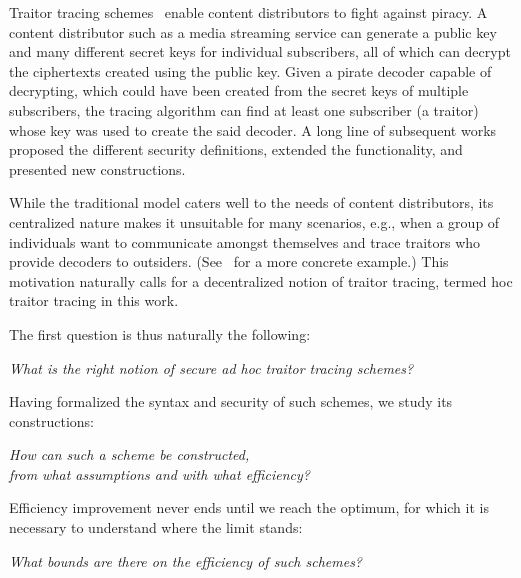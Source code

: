 Traitor tracing schemes~\cite{C:ChoFiaNao94} enable content distributors to fight against piracy.
A content distributor such as a media streaming service can generate a public key and many different secret keys for individual subscribers,
all of which can decrypt the ciphertexts created using the public key.
Given a pirate decoder capable of decrypting,
which could have been created from the secret keys of multiple subscribers,
the tracing algorithm can find at least one subscriber (a traitor) whose key was used to create the said decoder.
A long line of subsequent works~\cite{EC:BonSahWat06,CCS:BonWat06,CCS:BonNao08,C:BonZha14,EC:NisWicZha16,STOC:GoyKopWat18,C:GKRW18,TCC:CVWWW18,C:GQWW19,TCC:GoyKopWat19,C:Zhandry20,C:Zhandry21} proposed the different security definitions, extended the functionality, and presented new constructions.

While the traditional model caters well to the needs of content distributors,
its centralized nature makes it unsuitable for many scenarios,
e.g., when a group of individuals want to communicate amongst themselves and trace traitors who provide decoders to outsiders. (See~\cite{C:Zhandry21} for a more concrete example.)
This motivation naturally calls for a decentralized notion of traitor tracing, termed \ad hoc traitor tracing in this work.

The first question is thus naturally the following:
\begin{center}
\itshape
What is the right notion of secure ad hoc traitor tracing schemes?\\
\end{center}
Having formalized the syntax and security of such schemes,
we study its constructions:
\begin{center}
\itshape
How can such a scheme be constructed,\\
from what assumptions and with what efficiency?
\end{center}
Efficiency improvement never ends until we reach the optimum,
for which it is necessary to understand where the limit stands:
\begin{center}
\itshape
What bounds are there on the efficiency of such schemes?
\end{center}

